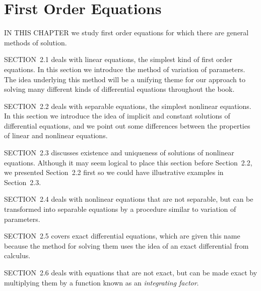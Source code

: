 \chapter{First Order Equations}

\noindent
IN THIS CHAPTER we study first order equations for which there are general methods of solution.

\medskip
\noindent
SECTION~2.1 deals with linear equations, the simplest kind of first order equations. In this section
we introduce the method of variation of parameters. The idea underlying this method will be a
unifying theme for our approach to solving many different kinds of differential equations throughout
the book.

\medskip
\noindent
SECTION~2.2 deals with separable equations, the simplest nonlinear equations. In this section we
introduce the idea of implicit and constant solutions of differential equations, and we point out
some differences between the properties of linear and nonlinear equations.

\medskip
\noindent
SECTION~2.3 discusses existence and uniqueness of solutions of nonlinear equations. Although it may
seem logical to place this section before Section~2.2, we presented Section~2.2 first so we could
have illustrative examples in Section~2.3.

\medskip
\noindent
SECTION~2.4 deals with nonlinear equations that are not separable, but can be transformed into
separable equations by a procedure similar to variation of parameters.

\medskip
\noindent
SECTION~2.5 covers exact differential equations, which are given this name because the method for
solving them uses the idea of an exact differential from calculus.

\medskip
\noindent
SECTION~2.6 deals with equations that are not exact, but can be made exact by multiplying them by a
function known as an {\color{blue}\it integrating factor\/}.

\newpage












